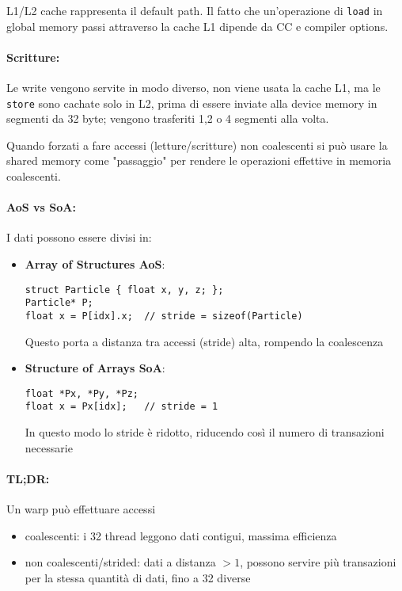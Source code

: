L1/L2 cache rappresenta il default path. Il fatto che un'operazione di \texttt{load} in global memory passi attraverso la cache L1 dipende da CC e compiler options.

\paragraph{Scritture:} Le write vengono servite in modo diverso, non viene usata la cache L1, ma le \texttt{store} sono cachate solo in L2, prima di essere inviate alla device memory in segmenti da 32 byte; vengono trasferiti 1,2 o 4 segmenti alla volta.

Quando forzati a fare accessi (letture/scritture) non coalescenti si può usare la shared memory come "passaggio" per rendere le operazioni effettive in memoria coalescenti.

\paragraph{AoS vs SoA:} I dati possono essere divisi in: 
\begin{itemize}
	\item \textbf{Array of Structures AoS}:
	\begin{lstlisting}
struct Particle { float x, y, z; };
Particle* P;
float x = P[idx].x;  // stride = sizeof(Particle)
	\end{lstlisting}
	Questo porta a distanza tra accessi (stride) alta, rompendo la coalescenza
	
	\item \textbf{Structure of Arrays SoA}:
	\begin{lstlisting}
float *Px, *Py, *Pz;
float x = Px[idx];   // stride = 1
	\end{lstlisting}
	In questo modo lo stride è ridotto, riducendo così il numero di transazioni necessarie
\end{itemize}

\paragraph{TL;DR:} Un warp può effettuare accessi
\begin{itemize}
	\item coalescenti: i 32 thread leggono dati contigui, massima efficienza
	\item non coalescenti/strided: dati a distanza $>1$, possono servire più transazioni per la stessa quantità di dati, fino a 32 diverse
\end{itemize}

